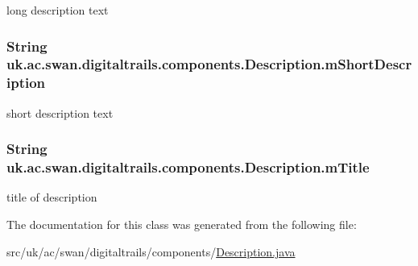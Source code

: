 long description text 

\hypertarget{classuk_1_1ac_1_1swan_1_1digitaltrails_1_1components_1_1_description_a99bd2b9f692d6f07746a875d1d9a3187}{
\subsubsection[{m\+Short\+Description}]{\setlength{\rightskip}{0pt plus 5cm}String uk.\+ac.\+swan.\+digitaltrails.\+components.\+Description.\+m\+Short\+Description\hspace{0.3cm}{\ttfamily [protected]}}}\label{classuk_1_1ac_1_1swan_1_1digitaltrails_1_1components_1_1_description_a99bd2b9f692d6f07746a875d1d9a3187}


short description text 

\hypertarget{classuk_1_1ac_1_1swan_1_1digitaltrails_1_1components_1_1_description_a316508bffd08105017ab21f7ce87801d}{
\subsubsection[{m\+Title}]{\setlength{\rightskip}{0pt plus 5cm}String uk.\+ac.\+swan.\+digitaltrails.\+components.\+Description.\+m\+Title\hspace{0.3cm}{\ttfamily [protected]}}}\label{classuk_1_1ac_1_1swan_1_1digitaltrails_1_1components_1_1_description_a316508bffd08105017ab21f7ce87801d}


title of description 



The documentation for this class was generated from the following file\+:\begin{DoxyCompactItemize}
\item 
src/uk/ac/swan/digitaltrails/components/\hyperlink{_description_8java}{Description.\+java}\end{DoxyCompactItemize}
